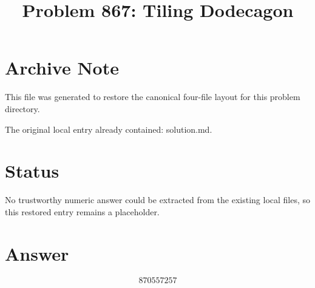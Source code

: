 \documentclass[11pt]{article}
\title{Problem 867: Tiling Dodecagon}
\author{}
\date{}
\begin{document}
\maketitle

\section{Archive Note}
This file was generated to restore the canonical four-file layout for this problem directory.

The original local entry already contained: solution.md.

\section{Status}

No trustworthy numeric answer could be extracted from the existing local files, so this restored entry remains a placeholder.

\section{Answer}

\[
\boxed{870557257}
\]
\end{document}
